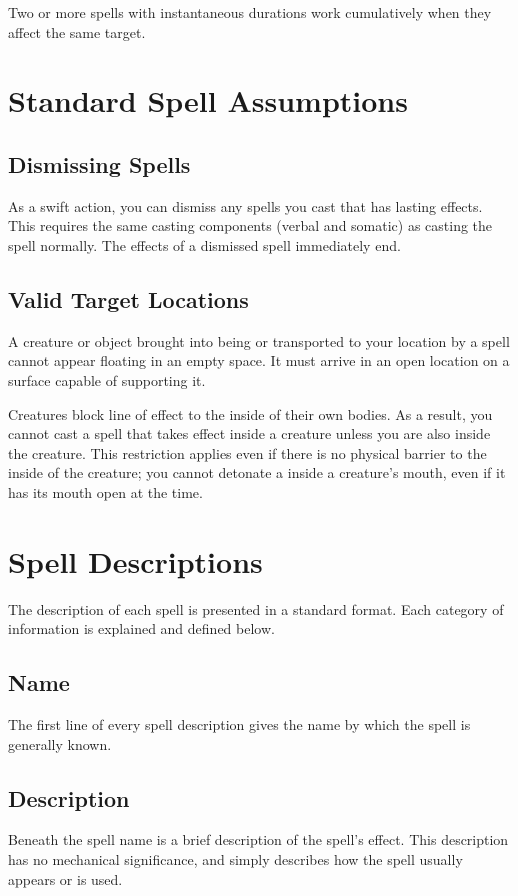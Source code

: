  Two or more spells with instantaneous durations work cumulatively when they affect the same target.

\section{Standard Spell Assumptions}

\subsection{Dismissing Spells}

As a swift action, you can dismiss any spells you cast that has lasting effects. This requires the same casting components (verbal and somatic) as casting the spell normally. The effects of a dismissed spell immediately end.

\subsection{Valid Target Locations}

 A creature or object brought into being or transported to your location by a spell cannot appear floating in an empty space. It must arrive in an open location on a surface capable of supporting it.

 Creatures block line of effect to the inside of their own bodies. As a result, you cannot cast a spell that takes effect inside a creature unless you are also inside the creature. This restriction applies even if there is no physical barrier to the inside of the creature; you cannot detonate a  inside a creature's mouth, even if it has its mouth open at the time.

\section{Spell Descriptions}
The description of each spell is presented in a standard format. Each category of information is explained and defined below.

\subsection{Name}
The first line of every spell description gives the name by which the spell is generally known.

\subsection{Description}
Beneath the spell name is a brief description of the spell's effect. This description has no mechanical significance, and simply describes how the spell usually appears or is used.

